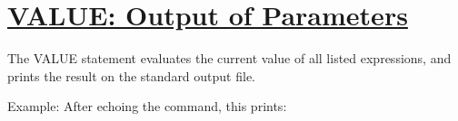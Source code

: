 \section{\href{par_output}{VALUE: Output of Parameters}}
The VALUE statement evaluates the current value of all listed expressions, and
prints the result on the standard output file.

Example:
After echoing the command, this prints:




